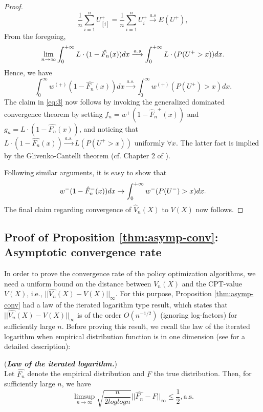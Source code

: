 \begin{proof}
$$
\frac{1}{n}
\sum_{i=1}^n U^+_{[i]}
=
\frac{1}{n}
\sum_{i=1}^n U^+_i
\overset{a.s}\longrightarrow 
E(U^+),
$$
From the foregoing,
$$
\lim_{n\rightarrow \infty} \int_0^{+\infty} L\cdot(1-\hat{F_n}(x)) dx
\overset{a.s} \longrightarrow
\int_0^{+\infty} L \cdot(P(U^+>x)) dx.$$
Hence, we have 
$$
\int_0^\infty w^{(+)}(1-\widehat{F_n}(x)) dx \xrightarrow{a.s.} 
\int_0^\infty w^{(+)}(P(U^+)>x) dx.
$$
The claim in \eqref{eq:3} now follows by invoking the generalized dominated convergence theorem by setting $f_n = w^+(1-{\hat F_n}^+(x))$ and $g_n = L\cdot(1-\hat{F_n}(x))$, and noticing that $L\cdot(1-\hat{F_n}(x)) \xrightarrow{a.s.} L(P(U^+>x))$ uniformly $\forall x$. The latter fact is implied by the Glivenko-Cantelli theorem (cf. Chapter 2 of \cite{wasserman2006}).

Following similar arguments, it is easy to show that 
$$
w^-(1-{\hat F_n}^-(x))  dx \rightarrow \int_0^{+\infty} w^-(P(U^-)>x) dx.
$$
The final claim regarding convergence of $\hat V_n(X)$ to $V(X)$ now follows.
\end{proof}
\subsection*{Proof of Proposition \ref{thm:asymp-conv}: Asymptotic convergence rate}
In order to prove the convergence rate of the policy optimization algorithms, we need a uniform bound on the distance between $V_n(X)$ and the CPT-value $V(X)$, i.e., $||\widehat{V_n}(X)-V(X)||_{\infty}$. For this purpose, Proposition \ref{thm:asymp-conv} had a law of the iterated logarithm type result, which states that $||\widehat{V_n}(X)-V(X)||_{\infty}$ is of the order $O(n^{-1/2})$ (ignoring log-factors) for sufficiently large $n$. 
Before proving this result, we recall the law of the iterated logarithm when empirical distribution function is in one dimension (see \cite{van2000asymptotic} for a detailed description):
\begin{theorem}(\textbf{\textit{Law of the iterated logarithm.}})
\\
Let 
$\hat{F_n}$ denote the empirical distribution and $F$ the true distribution. Then, for sufficiently large $n$, we have 
$$
\limsup_{n\rightarrow \infty} \sqrt{\frac{n}{2log log n}} ||\hat{F_n}-F||_{\infty} \leq \frac{1}{2}, \text{a.s.}
$$
\end{theorem}

